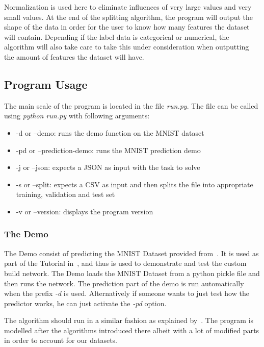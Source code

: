\documentclass{article}
\begin{document}
Normalization is used here to eliminate influences of very large values and very small values. At the end of the splitting algorithm, the program will output the shape of the data in order for the user to know how many features the dataset will contain. Depending if the label data is categorical or numerical, the algorithm will also take care to take this under consideration when outputting the amount of features the dataset will have.

\subsection{Program Usage}
\label{sub:program}

The main scale of the program is located in the file \textit{run.py}. The file can be called using \textit{python run.py} with following arguments:
\begin{itemize}
    \item -d or --demo: runs the demo function on the MNIST dataset
    \item -pd or --prediction-demo: runs the MNIST prediction demo 
    \item -j or --json: expects a JSON as input with the task to solve
    \item -s or --split: expects a CSV as input and then splits the file into appropriate training, validation and test set
    \item -v or --version: displays the program version
\end{itemize}


\subsubsection{The Demo}
\label{subsub:demo}
The Demo consist of predicting the MNIST Dataset provided from~\cite{MNISTSite}. It is used as part of the Tutorial in~\cite{deepLearning.org}, and thus is used to demonstrate and test the custom build network. The Demo loads the MNIST Dataset from a python pickle file and then runs the network. The prediction part of the demo is run automatically when the prefix \emph{-d} is used. Alternatively if someone wants to just test how the predictor works, he can just activate the \emph{-pd} option.

The algorithm should run in a similar fashion as explained by~\cite{theanoTutorial}. The program is modelled after the algorithms introduced there albeit with a lot of modified parts in order to account for our datasets.
\end{document}
